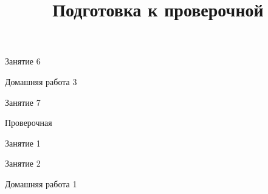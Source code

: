 \begin{class}[number=6]
	\begin{listofex}
		\item Занятие 6
	\end{listofex}
\end{class}

\begin{homework}[number=3]
	\begin{listofex}
		\item Домашняя работа 3
	\end{listofex}
\end{homework}

\begin{class}[number=7]
	\title{Подготовка к проверочной}
	\begin{listofex}
		\item Занятие 7
	\end{listofex}
\end{class}

\begin{exam}
	\begin{listofex}
		\item Проверочная
	\end{listofex}
\end{exam}
\begin{class}[number=1]
	\begin{listofex}
		\item Занятие 1
	\end{listofex}
\end{class}

\begin{class}[number=2]
	\begin{listofex}
		\item Занятие 2
	\end{listofex}
\end{class}

\begin{homework}[number=1]
	\begin{listofex}
		\item Домашняя работа 1
	\end{listofex}
\end{homework}

